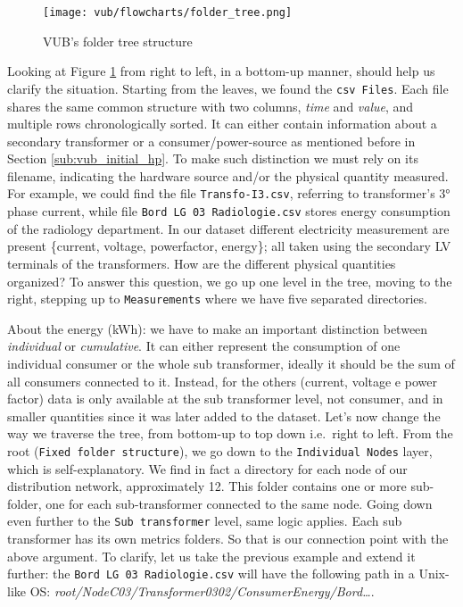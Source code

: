 \begin{figure}[ht]
    \texttt{[image: vub/flowcharts/folder\_tree.png]}
    \caption{\ac{VUB}'s folder tree structure}
    \label{fig:vub_folder_tree}
\end{figure}
Looking at Figure \ref{fig:vub_folder_tree} from right to left, in a bottom-up manner, should help us clarify the situation. %
Starting from the leaves, we found the \texttt{\ac{csv} Files}. Each file shares the same common structure with two columns, \textit{time} and \textit{value}, and multiple rows chronologically sorted.
It can either contain information about a secondary transformer or a consumer/power-source as mentioned before in Section \ref{sub:vub_initial_hp}. 
To make such distinction we must rely on its filename, indicating the hardware source and/or the physical quantity measured.
For example, we could find the file \texttt{Transfo-I3.csv}, referring to transformer's 3° phase current, while file \texttt{Bord LG 03 Radiologie.csv} stores energy consumption of the radiology department.
In our dataset different electricity measurement are present \{current, voltage, power\-factor, energy\}; all taken using the secondary \ac{LV} terminals of the transformers.
How are the different physical quantities organized? 
To answer this question, we go up one level in the tree, moving to the right, stepping up to \texttt{Measurements} where we have five separated directories.

About the energy (kWh): we have to make an important distinction between \textit{individual} or \textit{cumulative}. It can either represent the consumption of one individual consumer or the whole sub transformer, 
ideally it should be the sum of all consumers connected to it.
Instead, for the others (current, voltage e power factor) data is only available at the sub transformer level, not consumer, and in smaller quantities since it was later added to the dataset. 
Let's now change the way we traverse the tree, from bottom-up to top down i.e.\ right to left.
From the root (\texttt{Fixed folder structure}), we go down to the \texttt{Individual Nodes} layer, which is self-explanatory. We find in fact a directory for each node of our distribution network, approximately 12. 
This folder contains one or more sub-folder, one for each sub-transformer connected to the same node. Going down even further to the \texttt{Sub transformer} level, same logic applies. Each sub transformer has its own metrics folders.
So that is our connection point with the above argument.
To clarify, let us take the previous example and extend it further: the \texttt{Bord LG 03 Radiologie.csv} will have the following path in a Unix-like OS: \textit{root/NodeC03/Transformer0302/ConsumerEnergy/Bord\dots}.

